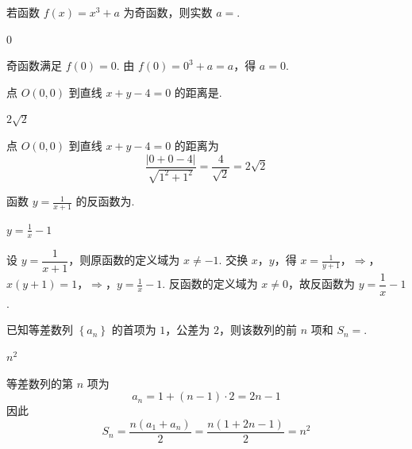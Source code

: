 \begin{problem}
若函数 \( f(x)=x^{3}+a \) 为奇函数，则实数 \( a=\)\fillinblank{}.
\end{problem}

\begin{answer}
\(0\)
\end{answer}

\begin{solution}
奇函数满足 \(f(0)=0\). 由 \(f(0)=0^3+a=a\)，得 \(a=0\).
\end{solution}

\begin{problem}
点 \( O(0,0) \) 到直线 \( x + y - 4 = 0 \) 的距离是\fillinblank{}.
\end{problem}

\begin{answer}
\(2\sqrt{2}\)
\end{answer}

\begin{solution}
点 \(O(0,0)\) 到直线 \(x+y-4=0\) 的距离为
\[
\frac{|0+0-4|}{\sqrt{1^2+1^2}}=\frac{4}{\sqrt{2}}=2\sqrt{2}
\]
\end{solution}

\begin{problem}
函数 \( y=\frac{1}{x+1} \) 的反函数为\fillinblank{}.
\end{problem}

\begin{answer}
\(y=\frac{1}{x}-1\)
\end{answer}

\begin{solution}
设 \(y=\dfrac{1}{x+1}\)，则原函数的定义域为 \(x\ne-1\). 交换 \(x\)，\(y\)，得
\(x=\frac{1}{y+1}\)，\(\Longrightarrow\)，\(x(y+1)=1\)，\(\Longrightarrow\)，\(y=\frac{1}{x}-1\).
反函数的定义域为 \(x\ne0\)，故反函数为 \(y=\dfrac{1}{x}-1\).
\end{solution}

\begin{problem}
已知等差数列 \( \left\{a_{n}\right\} \) 的首项为 \(1\)，公差为 \(2\)，则该数列的前 \(n\) 项和 \(S_{n}= \)\fillinblank{}.
\end{problem}

\begin{answer}
\(n^2\)
\end{answer}

\begin{solution}
等差数列的第 \(n\) 项为
\[
a_n=1+(n-1)\cdot2=2n-1
\]
因此
\[
S_n=\frac{n(a_1+a_n)}{2}=\frac{n(1+2n-1)}{2}=n^2
\]
\end{solution}

